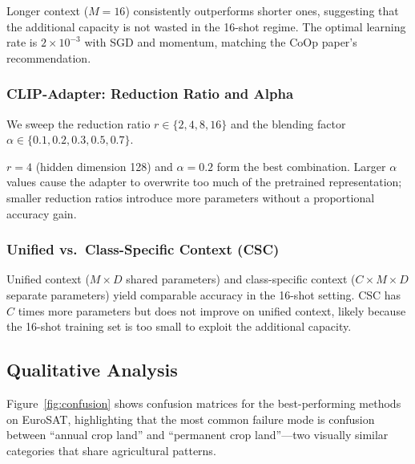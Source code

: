 \documentclass[10pt,twocolumn,letterpaper]{article}
\begin{document}
Longer context ($M{=}16$) consistently outperforms shorter ones,
suggesting that the additional capacity is not wasted in the 16-shot
regime.  The optimal learning rate is $2 \times 10^{-3}$ with SGD
and momentum, matching the CoOp paper's recommendation.

\subsubsection{CLIP-Adapter: Reduction Ratio and Alpha}

We sweep the reduction ratio $r \in \{2, 4, 8, 16\}$ and the blending
factor $\alpha \in \{0.1, 0.2, 0.3, 0.5, 0.7\}$.


$r{=}4$ (hidden dimension 128) and $\alpha{=}0.2$ form the best
combination.  Larger $\alpha$ values cause the adapter to overwrite
too much of the pretrained representation; smaller reduction ratios
introduce more parameters without a proportional accuracy gain.

\subsubsection{Unified vs.\ Class-Specific Context (CSC)}

Unified context ($M \times D$ shared parameters) and class-specific
context ($C \times M \times D$ separate parameters) yield comparable
accuracy in the 16-shot setting.  CSC has $C$ times more parameters
but does not improve on unified context, likely because the 16-shot
training set is too small to exploit the additional capacity.

\subsection{Qualitative Analysis}

Figure~\ref{fig:confusion} shows confusion matrices for the best-performing
methods on EuroSAT, highlighting that the most common failure mode is
confusion between ``annual crop land'' and ``permanent crop land''---two
visually similar categories that share agricultural patterns.
\end{document}
